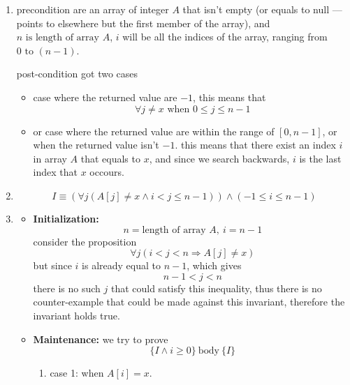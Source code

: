\documentclass{article}
\theoremstyle{remark}
\begin{document}
\begin{enumerate}
    \item precondition are an array of integer \(A\) that isn't empty (or equals to null --- points to elsewhere but the first member of the array), and \(n\text{ is length of array } A\), \(i\) will be all the indices of the array, ranging from \(0 \text{ to } (n-1)\).

    \vspace{1em}

    post-condition got two cases

    \begin{itemize}
        \item case where the returned value are \(-1\), this means that
        \[
        \forall j \ne x \text{ when } 0 \le j \le n - 1
        \]

        \item or case where the returned value are within the range of \([0, n-1]\), or when the returned value isn't \(-1\). this means that there exist an index \(i\) in array \(A\) that equals to \(x\), and since we search backwards, \(i\) is the last index that \(x\) occours.
    \end{itemize}

    \item \[
    I \equiv \left(\forall j \left(A[j] \ne x \land i < j \le n - 1\right)\right) \land (-1 \le i \le n - 1)
    \]

    \item     
    
    \begin{itemize}
        \item \textbf{Initialization: }
        \[
        n = \text{length of array } A,\ i = n - 1
        \]
        consider the proposition
        \[
        \forall j (i < j < n \Rightarrow A[j] \ne x)
        \]
        but since \(i\) is already equal to \(n - 1\), which gives
        \[
        n - 1 < j < n
        \]
        there is no such \(j\) that could satisfy this inequality, thus there is no counter-example that could be made against this invariant, therefore the invariant holds true.

        \item \textbf{Maintenance: }
        we try to prove
        \[
        \{I \land i \ge 0\}\ \text{body}\ \{I\}
        \]
        \begin{enumerate}
            \item case 1: when \(A[i] = x\).  


\end{enumerate}
\end{itemize}
\end{enumerate}
\end{document}
